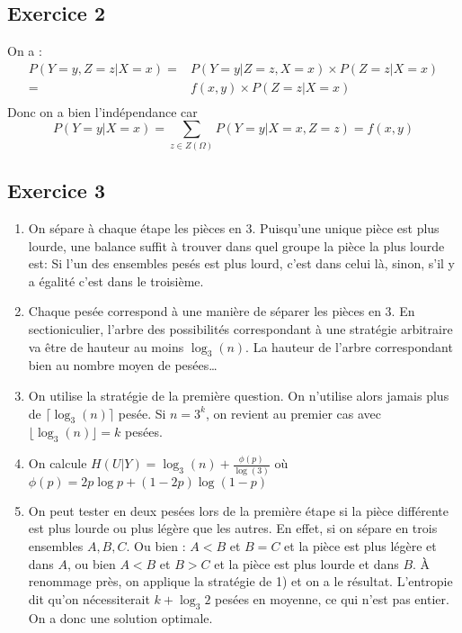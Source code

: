 \documentclass{cours}
\begin{document}
\subsection{Exercice 2}
On a : 
\[
	\begin{aligned}
		P(Y = y, Z = z | X = x) =& P(Y = y | Z = z, X = x)\times P(Z = z | X = x)\\
		=& f(x, y)\times P(Z = z | X = x)\\
	\end{aligned}
\]
Donc on a bien l'indépendance car 
\[
	P(Y = y | X = x) = \sum_{z \in Z(\Omega)} P(Y = y | X = x, Z = z) = f(x, y)
\]
\subsection{Exercice 3}
\begin{enumerate}
	\item On sépare à chaque étape les pièces en 3. Puisqu'une unique pièce est plus lourde, une balance suffit à trouver dans quel groupe la pièce la plus lourde est: Si l'un des ensembles pesés est plus lourd, c'est dans celui là, sinon, s'il y a égalité c'est dans le troisième. 
	\item Chaque pesée correspond à une manière de séparer les pièces en $3$. En sectioniculier, l'arbre des possibilités correspondant à une stratégie arbitraire va être de hauteur au moins $\log_{3}(n)$. 
		La hauteur de l'arbre correspondant bien au nombre moyen de pesées\ldots
	\item On utilise la stratégie de la première question. On n'utilise alors jamais plus de $\lceil\log_{3}(n)\rceil$ pesée. Si $n = 3^{k}$, on revient au premier cas avec $\lfloor \log_{3}(n) \rfloor = k$ pesées.
	\item On calcule $H(U|Y) = \log_{3}(n) + \frac{\phi(p)}{\log(3)}$ où $\phi(p) = 2p\log p + (1 - 2p)\log(1 - p)$	
	\item On peut tester en deux pesées lors de la première étape si la pièce différente est plus lourde ou plus légère que les autres. En effet, si on sépare en trois ensembles $A, B, C$. Ou bien : $A < B$ et $B = C$ et la pièce est plus légère et dans $A$, ou bien $A < B$ et $B > C$ et la pièce est plus lourde et dans $B$. À renommage près, on applique la stratégie de 1) et on a le résultat. 
	L'entropie dit qu'on nécessiterait $k + \log_{3} 2$ pesées en moyenne, ce qui n'est pas entier. On a donc une solution optimale. 
\end{enumerate}
\end{document}
